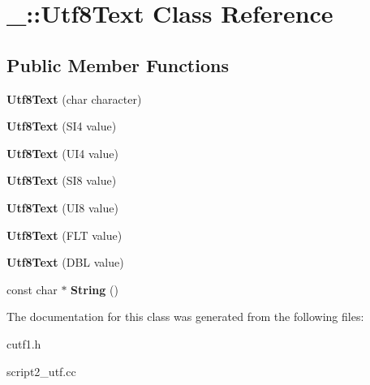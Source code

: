 \hypertarget{class___1_1_utf8_text}{}\section{\+\_\+\+:\+:Utf8\+Text Class Reference}
\label{class___1_1_utf8_text}
\subsection*{Public Member Functions}
\begin{DoxyCompactItemize}
\item 
\mbox{\label{class___1_1_utf8_text_a36ee98ee75033dad969e3c8b19882837}} 
{\bfseries Utf8\+Text} (char character)
\item 
\mbox{\label{class___1_1_utf8_text_a92045406e5433109be4ffdac6bca3d7a}} 
{\bfseries Utf8\+Text} (S\+I4 value)
\item 
\mbox{\label{class___1_1_utf8_text_a1cbc14dfeab144956d558e187f9901af}} 
{\bfseries Utf8\+Text} (U\+I4 value)
\item 
\mbox{\label{class___1_1_utf8_text_a1146c2ec0ad83a749feda61df3b8441e}} 
{\bfseries Utf8\+Text} (S\+I8 value)
\item 
\mbox{\label{class___1_1_utf8_text_aa61f92689a406224e6cfadc7d916cd9a}} 
{\bfseries Utf8\+Text} (U\+I8 value)
\item 
\mbox{\label{class___1_1_utf8_text_a8b760c7132b60e2c27bd3f9cfd503d36}} 
{\bfseries Utf8\+Text} (F\+LT value)
\item 
\mbox{\label{class___1_1_utf8_text_ad1576548492b0e43b16884eacc3dfe3d}} 
{\bfseries Utf8\+Text} (D\+BL value)
\item 
\mbox{\label{class___1_1_utf8_text_aaef31248826ab19834aa7b78df44b921}} 
const char $\ast$ {\bfseries String} ()
\end{DoxyCompactItemize}


The documentation for this class was generated from the following files\+:\begin{DoxyCompactItemize}
\item 
cutf1.\+h\item 
script2\+\_\+utf.\+cc\end{DoxyCompactItemize}
